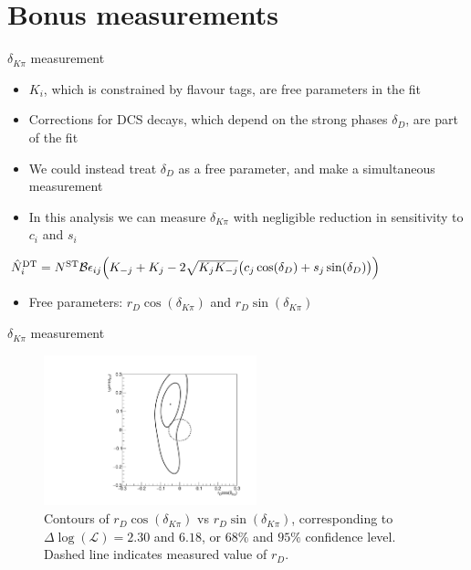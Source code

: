 \documentclass{beamer}
\begin{document}
\section{Bonus measurements}
\begin{frame}{$\delta_{K\pi}$ measurement}
  \begin{itemize}
    \setlength\itemsep{1.0em}
    \item{$K_i$, which is constrained by flavour tags, are free parameters in the fit}
    \item{Corrections for DCS decays, which depend on the strong phases $\delta_D$, are part of the fit}
    \item{We could instead treat $\delta_D$ as a free parameter, and make a simultaneous measurement}
    \item{In this analysis we can measure $\delta_{K\pi}$ with negligible reduction in sensitivity to $c_i$ and $s_i$}
  \end{itemize}
  \begin{center}
    $\hat{N}^{\rm DT}_i = N^{\rm ST}\mathcal{B}\epsilon_{ij}\Big(K_{-j} + K_j - 2\sqrt{K_jK_{-j}}\big(c_j\cos(\delta_D) + s_j\sin(\delta_D)\big)\Big)$
  \end{center}
  \begin{itemize}
    \item{Free parameters: $r_D\cos(\delta_{K\pi})$ and $r_D\sin(\delta_{K\pi})$}
  \end{itemize}
\end{frame}

\begin{frame}{$\delta_{K\pi}$ measurement}
  \begin{figure}
    \includegraphics[width=0.55\textwidth]{Plots/Contour_DeltaKpi.pdf}
    \caption{Contours of $r_D\cos(\delta_{K\pi})$ vs $r_D\sin(\delta_{K\pi})$, corresponding to $\Delta\log(\mathcal{L}) = 2.30$ and $6.18$, or $68\%$ and $95\%$ confidence level. Dashed line indicates measured value of $r_D$.}
  \end{figure}
\end{frame}
\end{document}
